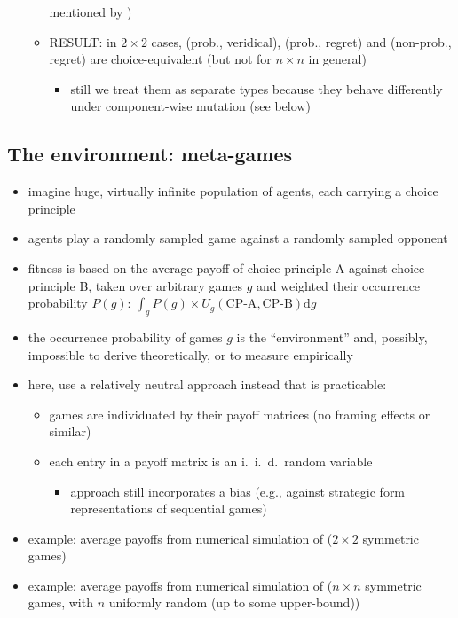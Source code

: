 \documentclass[fleqn,reqno,11pt]{article}
\begin{document}
\begin{itemize}
\begin{itemize}
    mentioned by \citet{HalpernPass2012:Iterated-Regret})
  \item RESULT: in $2 \times 2$ cases, (prob., veridical), (prob., regret) and (non-prob.,
    regret) are choice-equivalent (but not for $n \times n$ in general)
    \begin{itemize}
    \item still we treat them as separate types because they behave differently under
      component-wise mutation (see below)
    \end{itemize}
  \end{itemize}
\end{itemize}

\subsection{The environment: meta-games}

\begin{itemize}
\item imagine huge, virtually infinite population of agents, each carrying a choice principle
\item agents play a randomly sampled game against a randomly sampled opponent
\item fitness is based on the average payoff of choice principle A against choice principle B,
  taken over arbitrary games $g$ and weighted their occurrence probability $P(g)$:
  $\int_g P(g) \times U_g(\text{CP-A}, \text{CP-B}) \text{d}g$
\item the occurrence probability of games $g$ is the ``environment'' and, possibly, impossible to
  derive theoretically, or to measure empirically
\item here, use a relatively neutral approach instead that is practicable:
  \begin{itemize}
  \item games are individuated by their payoff matrices (no framing effects or similar)
  \item each entry in a payoff matrix is an i.~i.~d.~random variable
    \begin{itemize}
    \item approach still incorporates a bias (e.g., against strategic form representations of
      sequential games)
    \end{itemize}
  \end{itemize}
\item example: average payoffs from numerical simulation of ($2 \times 2$ symmetric games)
\item example: average payoffs from numerical simulation of ($n \times n$ symmetric games, with
  $n$ uniformly random (up to some upper-bound))
\end{itemize}
\end{document}
